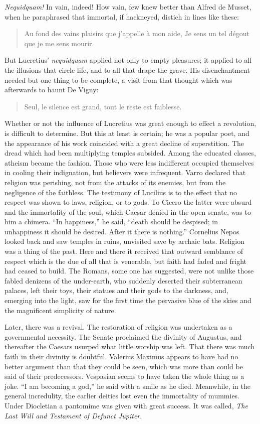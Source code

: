 \documentclass[]{book}
\begin{document}
\emph{Nequidquam!} In vain, indeed! How vain, few knew better than
Alfred de Musset, when he paraphrased that immortal, if hackneyed,
distich in lines like these:

\begin{quote}
Au fond des vains plaisirs que j'appelle à mon aide, Je sens un tel
dégout que je me sens mourir.
\end{quote}

But Lucretius' \emph{nequidquam} applied not only to empty pleasures; it
applied to all the illusions that circle life, and to all that drape the
grave. His disenchantment needed but one thing to be complete, a visit
from that thought which was afterwards to haunt De Vigny:

\begin{quote}
Seul, le silence est grand, tout le reste est faiblesse.
\end{quote}

Whether or not the influence of Lucretius was great enough to effect a
revolution, is difficult to determine. But this at least is certain; he
was a popular poet, and the appearance of his work coincided with a
great decline of superstition. The dread which had been multiplying
temples subsided. Among the educated classes, atheism became the
fashion. Those who were less indifferent occupied themselves in cooling
their indignation, but believers were infrequent. Varro declared that
religion was perishing, not from the attacks of its enemies, but from
the negligence of the faithless. The testimony of Lucilius is to the
effect that no respect was shown to laws, religion, or to gods. To
Cicero the latter were absurd and the immortality of the soul, which
Caesar denied in the open senate, was to him a chimera. ``In
happiness,'' he said, ``death should be despised; in unhappiness it
should be desired. After it there is nothing.'' Cornelius Nepos looked
back and saw temples in ruins, unvisited save by archaic bats. Religion
was a thing of the past. Here and there it received that outward
semblance of respect which is the due of all that is venerable, but
faith had faded and fright had ceased to build. The Romans, some one has
suggested, were not unlike those fabled denizens of the under-earth, who
suddenly deserted their subterranean palaces, left their toys, their
statues and their gods to the darkness, and, emerging into the light,
saw for the first time the pervasive blue of the skies and the
magnificent simplicity of nature.

Later, there was a revival. The restoration of religion was undertaken
as a governmental necessity. The Senate proclaimed the divinity of
Augustus, and thereafter the Caesars usurped what little worship was
left. That there was much faith in their divinity is doubtful. Valerius
Maximus appears to have had no better argument than that they could be
seen, which was more than could be said of their predecessors. Vespasian
seems to have taken the whole thing as a joke. ``I am becoming a god,''
he said with a smile as he died. Meanwhile, in the general incredulity,
the earlier deities lost even the immortality of mummies. Under
Diocletian a pantomime was given with great success. It was called,
\emph{The Last Will and Testament of Defunct Jupiter}.
\end{document}
